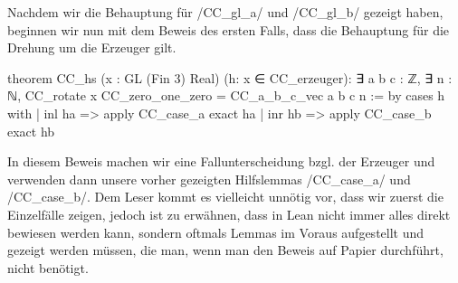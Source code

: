 \documentclass[10pt]{article}
\begin{document}
\noindent Nachdem wir die Behauptung für \lean/CC_gl_a/ und \lean/CC_gl_b/ gezeigt haben, beginnen wir nun mit dem Beweis des ersten Falls, dass die Behauptung für die Drehung um die Erzeuger gilt.
\vspace{-0.1cm}
\begin{leancode}
theorem CC_hs (x : GL (Fin 3) Real) (h: x ∈ CC_erzeuger): 
∃ a b c : ℤ, ∃ n : ℕ, CC_rotate x CC_zero_one_zero = CC_a_b_c_vec a b c n := by
    cases h with
    | inl ha =>
        apply CC_case_a
        exact ha
    | inr hb =>
        apply CC_case_b
        exact hb
\end{leancode}
\vspace{-0.1cm}
\noindent In diesem Beweis machen wir eine Fallunterscheidung bzgl. der Erzeuger und verwenden dann unsere vorher gezeigten Hilfslemmas \lean/CC_case_a/ und \lean/CC_case_b/. Dem Leser kommt es vielleicht unnötig vor, dass wir zuerst die Einzelfälle zeigen, jedoch ist zu erwähnen, dass in Lean nicht immer alles direkt bewiesen werden kann, sondern oftmals Lemmas im Voraus aufgestellt und gezeigt werden müssen, die man, wenn man den Beweis auf Papier durchführt, nicht benötigt. 
\end{document}

